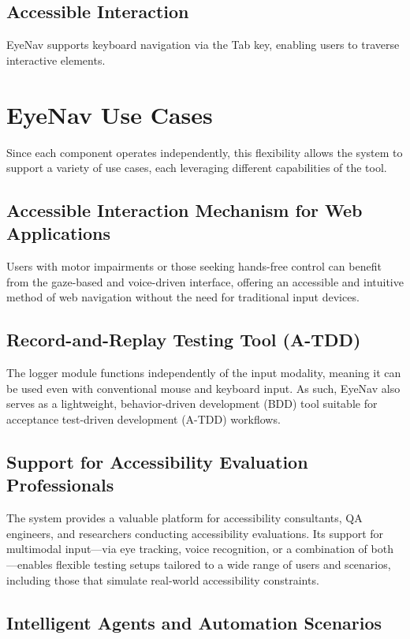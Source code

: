 \subsection{Accessible Interaction}
EyeNav supports keyboard navigation via the Tab key, enabling users to traverse interactive elements.

\section{EyeNav Use Cases}

Since each component operates independently, this flexibility allows the system to support a variety of use cases, each leveraging different capabilities of the tool.

\subsection{Accessible Interaction Mechanism for Web Applications}
Users with motor impairments or those seeking hands-free control can benefit from the gaze-based and voice-driven interface, offering an accessible and intuitive method of web navigation without the need for traditional input devices.

\subsection{Record-and-Replay Testing Tool (A-TDD)}

The logger module functions independently of the input modality, meaning it can be used even with conventional mouse and keyboard input. As such, EyeNav also serves as a lightweight, behavior-driven development (BDD) tool suitable for acceptance test-driven development (A-TDD) workflows.

\subsection{Support for Accessibility Evaluation Professionals}

The system provides a valuable platform for accessibility consultants, QA engineers, and researchers conducting accessibility evaluations. Its support for multimodal input—via eye tracking, voice recognition, or a combination of both—enables flexible testing setups tailored to a wide range of users and scenarios, including those that simulate real-world accessibility constraints.

\subsection{Intelligent Agents and Automation Scenarios}

